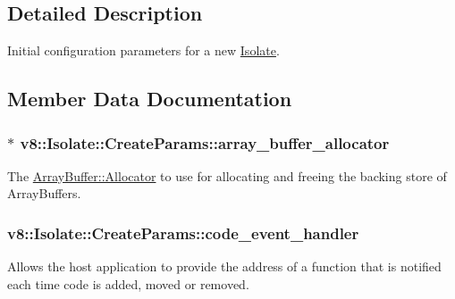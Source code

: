 \subsection{Detailed Description}
Initial configuration parameters for a new \hyperlink{classv8_1_1_isolate}{Isolate}. 

\subsection{Member Data Documentation}
\hypertarget{structv8_1_1_isolate_1_1_create_params_a7c663f70b64290392eeaf164f57585f9}{}
\subsubsection[{array\+\_\+buffer\+\_\+allocator}]{$\ast$ v8\+::\+Isolate\+::\+Create\+Params\+::array\+\_\+buffer\+\_\+allocator}\label{structv8_1_1_isolate_1_1_create_params_a7c663f70b64290392eeaf164f57585f9}
The \hyperlink{classv8_1_1_array_buffer_1_1_allocator}{Array\+Buffer\+::\+Allocator} to use for allocating and freeing the backing store of Array\+Buffers. \hypertarget{structv8_1_1_isolate_1_1_create_params_a783e3eba90ce6e2800bdd69197bbccdd}{}
\subsubsection[{code\+\_\+event\+\_\+handler}]{ v8\+::\+Isolate\+::\+Create\+Params\+::code\+\_\+event\+\_\+handler}\label{structv8_1_1_isolate_1_1_create_params_a783e3eba90ce6e2800bdd69197bbccdd}
Allows the host application to provide the address of a function that is notified each time code is added, moved or removed. \hypertarget{structv8_1_1_isolate_1_1_create_params_a2c570b306aa8c1c24cfe70e8eee50fa1}{}
